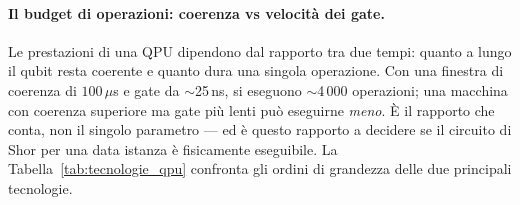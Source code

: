 \paragraph{Il budget di operazioni: coerenza vs velocità dei gate.}
Le prestazioni di una QPU dipendono dal rapporto tra due tempi: quanto a lungo il qubit resta coerente e quanto dura una singola operazione. Con una finestra di coerenza di $100\,\mu$s e gate da $\sim$25\,ns, si eseguono $\sim$4\,000 operazioni; una macchina con coerenza superiore ma gate più lenti può eseguirne \emph{meno}. È il rapporto che conta, non il singolo parametro --- ed è questo rapporto a decidere se il circuito di Shor per una data istanza è fisicamente eseguibile. La Tabella~\ref{tab:tecnologie_qpu} confronta gli ordini di grandezza delle due principali tecnologie.

\begin{table}[H]
\centering
{}
\caption[Confronto tra tecnologie di QPU: superconduttori vs ioni intrappolati]{Ordini di grandezza indicativi delle due principali tecnologie di \ac{QPU}. La coerenza lunghissima degli ioni intrappolati non si traduce in più operazioni utili, perché i gate sono da $10^3$ a $10^4$ volte più lenti: il budget di operazioni per finestra di coerenza è simile, ma i superconduttori lo spendono molto più in fretta. Gli ioni sono invece più robusti su lettura e crosstalk.}
\label{tab:tecnologie_qpu}
\end{table}

